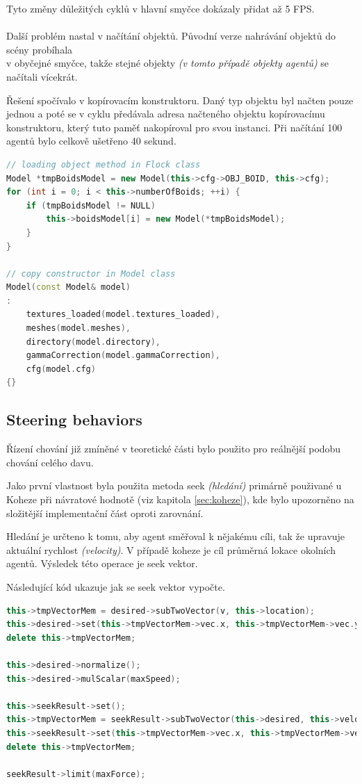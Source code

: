 \documentclass[czech,public,dept460,male,cpdeclaration]{diploma}
\begin{document}
Tyto změny důležitých cyklů v hlavní smyčce dokázaly přidat až 5 FPS.
\\\\
Další problém nastal v načítání objektů. Původní verze nahrávání objektů do scény probíhala\\ v obyčejné smyčce, takže stejné objekty \textit{(v tomto případě objekty agentů)} se načítali vícekrát. 

Řešení spočívalo v kopírovacím konstruktoru. Daný typ objektu byl načten pouze jednou a poté se v cyklu předávala adresa načteného objektu kopírovacímu konstruktoru, který tuto paměť nakopíroval pro svou instanci. Při načítání 100 agentů bylo celkově ušetřeno 40 sekund.

\begin{lstlisting}[language=c++,label=src:copy constructor,caption=Ukázka použití kopírovacího konstruktoru]
// loading object method in Flock class
Model *tmpBoidsModel = new Model(this->cfg->OBJ_BOID, this->cfg);
for (int i = 0; i < this->numberOfBoids; ++i) {
	if (tmpBoidsModel != NULL)
		this->boidsModel[i] = new Model(*tmpBoidsModel);
	}
}

// copy constructor in Model class
Model(const Model& model) 
: 
	textures_loaded(model.textures_loaded),
	meshes(model.meshes),
	directory(model.directory),
	gammaCorrection(model.gammaCorrection),
	cfg(model.cfg)
{}
\end{lstlisting}

\subsection{Steering behaviors}\label{sec:steering-behaviors}
Řízení chování \cite{linkToSteeringBehaviors} již zmíněné v teoretické části bylo použito pro reálnější podobu chování celého davu.

Jako první vlastnost byla použita metoda seek \textit{(hledání)} primárně použivané u Koheze při návratové hodnotě (viz kapitola \ref{sec:koheze}), kde bylo upozorněno na složitější implementační část oproti zarovnání.

Hledání je určteno k tomu, aby agent směřoval k nějakému cíli, tak že upravuje aktuální rychlost \textit{(velocity)}. V případě koheze je cíl průměrná lokace okolních agentů. Výsledek této operace je seek vektor.

Následující kód ukazuje jak se seek vektor vypočte.

\begin{lstlisting}[language=c++,label=src:seek,caption=Vypočtení seek vektoru]
this->tmpVectorMem = desired->subTwoVector(v, this->location);
this->desired->set(this->tmpVectorMem->vec.x, this->tmpVectorMem->vec.y, this->tmpVectorMem->vec.z);
delete this->tmpVectorMem;

this->desired->normalize();
this->desired->mulScalar(maxSpeed);

this->seekResult->set();
this->tmpVectorMem = seekResult->subTwoVector(this->desired, this->velocity);
this->seekResult->set(this->tmpVectorMem->vec.x, this->tmpVectorMem->vec.y, this->tmpVectorMem->vec.z);
delete this->tmpVectorMem;

seekResult->limit(maxForce);
\end{lstlisting}
\end{document}

